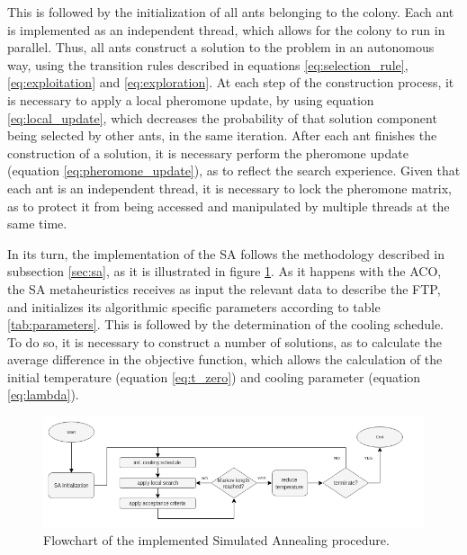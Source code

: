This is followed by the initialization of all ants belonging to the colony. Each ant is implemented as an independent thread, which allows for the colony to run in parallel. Thus, all ants construct a solution to the problem in an autonomous way, using the transition rules described in equations \ref{eq:selection_rule}, \ref{eq:exploitation} and \ref{eq:exploration}. At each step of the construction process, it is necessary to apply a local pheromone update, by using equation \ref{eq:local_update}, which decreases the probability of that solution component being selected by other ants, in the same iteration. After each ant finishes the construction of a solution, it is necessary perform the pheromone update (equation \ref{eq:pheromone_update}), as to reflect the search experience. Given that each ant is an independent thread, it is necessary to lock the pheromone matrix, as to protect it from being accessed and manipulated by multiple threads at the same time.

In its turn, the implementation of the SA follows the methodology described in subsection \ref{sec:sa}, as it is illustrated in figure \ref{fig:sa_flow}. As it happens with the ACO, the SA metaheuristics receives as input the relevant data to describe the FTP, and initializes its algorithmic specific parameters according to table \ref{tab:parameters}. This is followed by the determination of the cooling schedule. To do so, it is necessary to construct a number of solutions, as to calculate the average difference in the objective function, which allows the calculation of the initial temperature (equation \ref{eq:t_zero}) and cooling parameter (equation \ref{eq:lambda}). 

\begin{figure}[h]
  \centering
  \includegraphics[width=\textwidth]{./Figures/system_implementation/sa_flow.png}
  \caption{Flowchart of the implemented Simulated Annealing procedure.}
  \label{fig:sa_flow}  
\end{figure}


